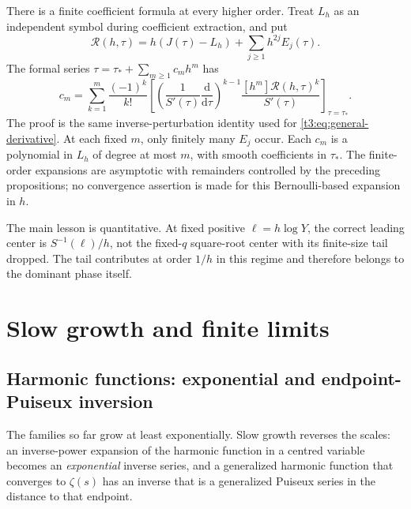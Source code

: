 \documentclass[11pt,openany]{book}
\numberwithin{equation}{chapter}
\theoremstyle{plain}
\theoremstyle{definition}
\theoremstyle{remark}
\newcommand{\ddn}{\mathrm d}                  %
\begin{document}
There is a finite coefficient formula at every higher order. Treat $L_h$ as an independent symbol during coefficient extraction, and put
\begin{equation}\label{t3:eq:crossoverR}
 \mathcal R(h,\tau)=h(J(\tau)-L_h)
                  +\sum_{j\ge1}h^{2j}E_j(\tau).
\end{equation}
The formal series $\tau=\tau_*+\sum_{m\ge1}c_mh^m$ has
\begin{equation}\label{t3:eq:crossover-all}
 c_m=\sum_{k=1}^m\frac{(-1)^k}{k!}
 \left[
 \left(\frac1{S'(\tau)}\frac{\ddn}{\ddn\tau}\right)^{k-1}
 \frac{[h^m]\mathcal R(h,\tau)^k}{S'(\tau)}
 \right]_{\tau=\tau_*}.
\end{equation}
The proof is the same inverse-perturbation identity used for
\eqref{t3:eq:general-derivative}. At each fixed $m$, only finitely many $E_j$ occur. Each $c_m$ is a polynomial in $L_h$ of degree at most $m$, with smooth coefficients in $\tau_*$. The finite-order expansions are asymptotic with remainders controlled by the preceding propositions; no convergence assertion is made for this Bernoulli-based expansion in $h$.

The main lesson is quantitative. At fixed positive $\ell=h\log Y$, the correct leading center is $S^{-1}(\ell)/h$, not the fixed-$q$ square-root center with its finite-size tail dropped. The tail contributes at order $1/h$ in this regime and therefore belongs to the dominant phase itself.

\part{Slow growth and finite limits}
\label{ct:part:slow}

\chapter{Harmonic functions: exponential and endpoint-Puiseux inversion}
\label{ct:ch:harmonic}

The families so far grow at least exponentially.  Slow growth reverses the
scales: an inverse-power expansion of the harmonic function in a centred
variable becomes an \emph{exponential} inverse series, and a generalized
harmonic function that converges to $\zeta(s)$ has an inverse that is a
generalized Puiseux series in the distance to that endpoint.

\label{t2:sec:harmonic}
\end{document}
